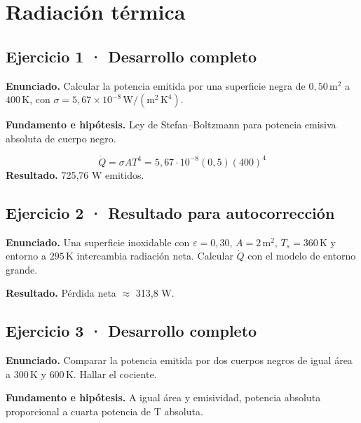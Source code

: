 \documentclass[11pt,a4paper]{article}
\begin{document}
\clearpage

\section{Radiación térmica}

\begin{center}\end{center}

\subsection*{Ejercicio 1 · Desarrollo completo}
\textbf{Enunciado.} Calcular la potencia emitida por una superficie negra de \(0{,}50\,\mathrm m^2\) a \(400\,\mathrm K\), con \(\sigma=5{,}67\times10^{-8}\,\mathrm{W/(m^2\,K^4)}\).

\textbf{Fundamento e hipótesis.} Ley de Stefan--Boltzmann para potencia emisiva absoluta de cuerpo negro.

\[
\dot Q=\sigma AT^4=5{,}67\cdot10^{-8}(0{,}5)(400)^4
\]
\textbf{Resultado.} 725,76 W emitidos.


\subsection*{Ejercicio 2 · Resultado para autocorrección}
\textbf{Enunciado.} Una superficie inoxidable con \(\varepsilon=0{,}30\), \(A=2\,\mathrm m^2\), \(T_s=360\,\mathrm K\) y entorno a \(295\,\mathrm K\) intercambia radiación neta. Calcular \(\dot Q\) con el modelo de entorno grande.

\textbf{Resultado.} Pérdida neta \ensuremath{\approx} 313,8 W.


\subsection*{Ejercicio 3 · Desarrollo completo}
\textbf{Enunciado.} Comparar la potencia emitida por dos cuerpos negros de igual área a \(300\,\mathrm K\) y \(600\,\mathrm K\). Hallar el cociente.

\textbf{Fundamento e hipótesis.} A igual área y emisividad, potencia absoluta proporcional a cuarta potencia de T absoluta.
\end{document}
